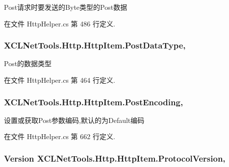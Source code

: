 Post请求时要发送的\-Byte类型的\-Post数据 



在文件 Http\-Helper.\-cs 第 486 行定义.

\hypertarget{class_x_c_l_net_tools_1_1_http_1_1_http_item_abe960305b9cbbdf683e2fc100ce230b7}{
\subsubsection[{Post\-Data\-Type}]{ X\-C\-L\-Net\-Tools.\-Http.\-Http\-Item.\-Post\-Data\-Type\hspace{0.3cm}{\ttfamily [get]}, {\ttfamily [set]}}}\label{class_x_c_l_net_tools_1_1_http_1_1_http_item_abe960305b9cbbdf683e2fc100ce230b7}


Post的数据类型 



在文件 Http\-Helper.\-cs 第 464 行定义.

\hypertarget{class_x_c_l_net_tools_1_1_http_1_1_http_item_a75c55be0dc77b94b342b4360e0e4c6fa}{
\subsubsection[{Post\-Encoding}]{ X\-C\-L\-Net\-Tools.\-Http.\-Http\-Item.\-Post\-Encoding\hspace{0.3cm}{\ttfamily [get]}, {\ttfamily [set]}}}\label{class_x_c_l_net_tools_1_1_http_1_1_http_item_a75c55be0dc77b94b342b4360e0e4c6fa}


设置或获取\-Post参数编码,默认的为\-Default编码 



在文件 Http\-Helper.\-cs 第 662 行定义.

\hypertarget{class_x_c_l_net_tools_1_1_http_1_1_http_item_a3c18cc4172e07e7f957ed081ca371625}{
\subsubsection[{Protocol\-Version}]{\setlength{\rightskip}{0pt plus 5cm}Version X\-C\-L\-Net\-Tools.\-Http.\-Http\-Item.\-Protocol\-Version\hspace{0.3cm}{\ttfamily [get]}, {\ttfamily [set]}}}\label{class_x_c_l_net_tools_1_1_http_1_1_http_item_a3c18cc4172e07e7f957ed081ca371625}



